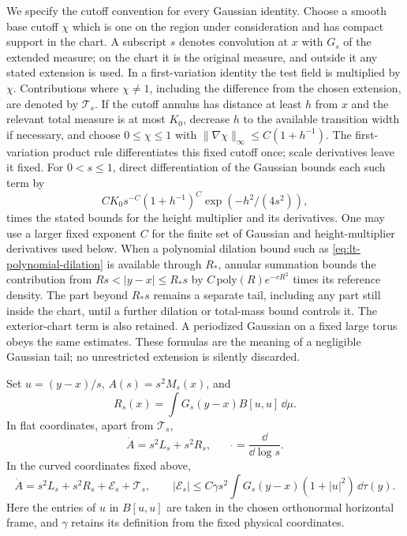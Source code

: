 We specify the cutoff convention for every Gaussian identity.  Choose a
smooth base cutoff $\chi$ which is one on the region under consideration
and has compact support in the chart.  A subscript $s$ denotes convolution
at $x$ with $G_s$ of the extended measure; on the chart it is the original
measure, and outside it any stated extension is used.  In a first-variation
identity the test field is multiplied by $\chi$.  Contributions where
$\chi\ne1$, including the difference from the chosen extension, are denoted
by $\mathcal T_s$.  If the cutoff annulus has distance at least $h$ from $x$
and the relevant total measure is at most $K_0$, decrease $h$ to the
available transition width if necessary, and choose $0\le\chi\le1$ with
$\|\nabla\chi\|_\infty\le C(1+h^{-1})$.  The first-variation product rule
differentiates this fixed cutoff once; scale derivatives leave it fixed.
For $0<s\le1$, direct differentiation of the Gaussian bounds each such term by
\begin{equation}\label{eq:lt-chart-tail}
 C K_0 s^{-C}(1+h^{-1})^C\exp(-h^2/(4s^2)),
\end{equation}
times the stated bounds for the height multiplier and its derivatives.
One may use a larger fixed exponent $C$ for the finite set of Gaussian and
height-multiplier derivatives used below.
When a polynomial dilation bound such as
\eqref{eq:lt-polynomial-dilation} is available through $R_*$, annular
summation bounds the contribution from $Rs<|y-x|\le R_*s$ by
$C\,\mathrm{poly}(R)e^{-cR^2}$ times its reference density.  The part
beyond $R_*s$ remains a separate tail, including any part still inside
the chart, until a further dilation or total-mass bound controls it.
The exterior-chart term is also retained.  A periodized
Gaussian on a fixed large torus obeys the same estimates.  These formulas
are the meaning of a negligible Gaussian tail; no unrestricted extension
is silently discarded.

\begin{lemma}\label{lt:gaussian}
Set $u=(y-x)/s$, $A(s)=s^2M_s(x)$, and
\[
 R_s(x)=\int G_s(y-x)B[u,u]\,\dd\mu.
\]
In flat coordinates, apart from $\mathcal T_s$,
\begin{equation}\label{eq:lt-gaussian-flat}
 \dot A=s^2L_s+s^2R_s,
 \qquad \dot{}=\frac{\dd}{\dd\log s}.
\end{equation}
In the curved coordinates fixed above,
\begin{equation}\label{eq:lt-gaussian-curved}
 \dot A=s^2L_s+s^2R_s+\mathcal E_s+\mathcal T_s,
 \qquad
 |\mathcal E_s|\le C\gamma s^2
           \int G_s(y-x)(1+|u|^2)\,\dd\tau(y).
\end{equation}
Here the entries of $u$ in $B[u,u]$ are taken in the chosen orthonormal
horizontal frame, and $\gamma$ retains its definition from the fixed
physical coordinates.
\end{lemma}

